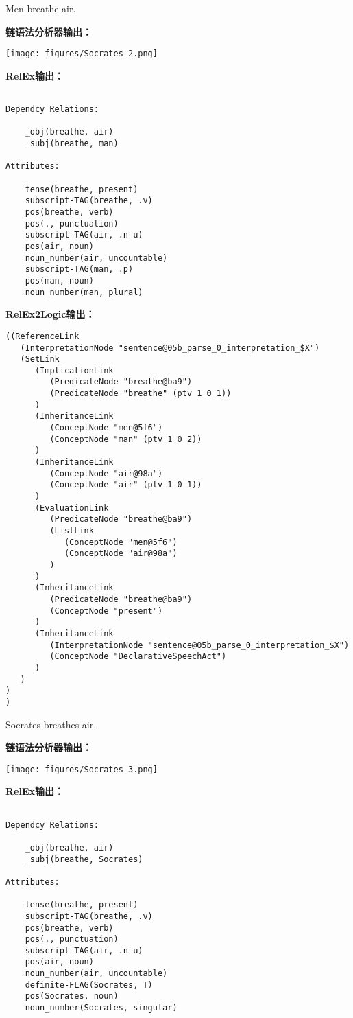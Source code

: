  Men breathe air.

{\bf 链语法分析器输出：}

\texttt{[image: figures/Socrates\_2.png]}


{\bf RelEx输出：}

\begin{verbatim}

Dependcy Relations:

    _obj(breathe, air)
    _subj(breathe, man)

Attributes:

    tense(breathe, present)
    subscript-TAG(breathe, .v)
    pos(breathe, verb)
    pos(., punctuation)
    subscript-TAG(air, .n-u)
    pos(air, noun)
    noun_number(air, uncountable)
    subscript-TAG(man, .p)
    pos(man, noun)
    noun_number(man, plural)

\end{verbatim}

{\bf RelEx2Logic输出：}

{\tt\begin{small}\begin{lstlisting}
((ReferenceLink
   (InterpretationNode "sentence@05b_parse_0_interpretation_$X")
   (SetLink
      (ImplicationLink
         (PredicateNode "breathe@ba9")
         (PredicateNode "breathe" (ptv 1 0 1))
      )
      (InheritanceLink
         (ConceptNode "men@5f6")
         (ConceptNode "man" (ptv 1 0 2))
      )
      (InheritanceLink
         (ConceptNode "air@98a")
         (ConceptNode "air" (ptv 1 0 1))
      )
      (EvaluationLink
         (PredicateNode "breathe@ba9")
         (ListLink
            (ConceptNode "men@5f6")
            (ConceptNode "air@98a")
         )
      )
      (InheritanceLink
         (PredicateNode "breathe@ba9")
         (ConceptNode "present")
      )
      (InheritanceLink
         (InterpretationNode "sentence@05b_parse_0_interpretation_$X")
         (ConceptNode "DeclarativeSpeechAct")
      )
   )
)
)
\end{lstlisting}\end{small}}

  Socrates breathes air.

{\bf 链语法分析器输出：}

\texttt{[image: figures/Socrates\_3.png]}

{\bf RelEx输出：}

\begin{verbatim}

Dependcy Relations:

    _obj(breathe, air)
    _subj(breathe, Socrates)

Attributes:

    tense(breathe, present)
    subscript-TAG(breathe, .v)
    pos(breathe, verb)
    pos(., punctuation)
    subscript-TAG(air, .n-u)
    pos(air, noun)
    noun_number(air, uncountable)
    definite-FLAG(Socrates, T)
    pos(Socrates, noun)
    noun_number(Socrates, singular)

\end{verbatim}

